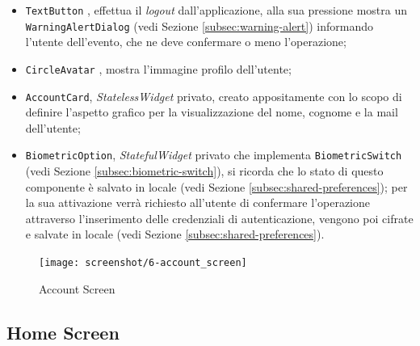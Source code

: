 \begin{itemize}
    \item \lstinline{TextButton} \cite{site:text-button}, effettua il \emph{logout} dall'applicazione, alla sua pressione mostra un \lstinline{WarningAlertDialog} (vedi Sezione \ref{subsec:warning-alert}) informando l'utente dell'evento, che ne deve confermare o meno l'operazione;
    \item \lstinline{CircleAvatar} \cite{site:circle-avatar}, mostra l'immagine profilo dell'utente;
    \item \lstinline{AccountCard}, \emph{StatelessWidget} privato, creato appositamente con lo scopo di definire l'aspetto grafico per la visualizzazione del nome, cognome e la mail dell'utente;
    \item \lstinline{BiometricOption}, \emph{StatefulWidget} privato che implementa \lstinline{BiometricSwitch} (vedi Sezione \ref{subsec:biometric-switch}), si ricorda che lo stato di questo componente è salvato in locale (vedi Sezione \ref{subsec:shared-preferences}); per la sua attivazione verrà richiesto all'utente di confermare l'operazione attraverso l'inserimento delle credenziali di autenticazione, vengono poi cifrate e salvate in locale (vedi Sezione \ref{subsec:shared-preferences}).
\end{itemize}

\begin{figure}[!h] 
    \centering 
    \texttt{[image: screenshot/6-account\_screen]} 
    \caption{Account Screen}
    \label{fig:account-screen}
\end{figure}

\subsection{Home Screen}
\label{subsec:home-screen}

